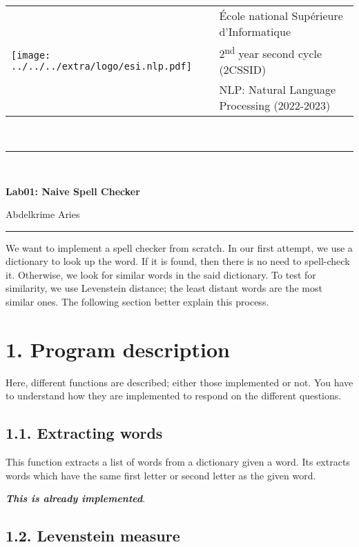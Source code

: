 \documentclass[11pt, a4paper]{article}
\begin{document}

\noindent
\begin{tabular}{ll}
\multirow{3}{*}{\texttt{[image: ../../../extra/logo/esi.nlp.pdf]}} & 
\'Ecole national Supérieure d'Informatique\\
& 2\textsuperscript{nd} year second cycle (2CSSID)\\
& NLP: Natural Language Processing (2022-2023)
\end{tabular}\\[.25cm]
\noindent\rule{\textwidth}{2pt}\\[-0.5cm]
\begin{center}
{\LARGE \textbf{Lab01: Naive Spell Checker}}
\begin{flushright}
	Abdelkrime Aries
\end{flushright}
\end{center}\vspace{-0.5cm}
\noindent\rule{\textwidth}{2pt}

We want to implement a spell checker from scratch. 
In our first attempt, we use a dictionary to look up the word.
If it is found, then there is no need to spell-check it.
Otherwise, we look for similar words in the said dictionary.
To test for similarity, we use Levenstein distance; the least distant words are the most similar ones.
The following section better explain this process.


\section*{1. Program description}

Here, different functions are described; either those implemented or not. 
You have to understand how they are implemented to respond on the different questions.

\subsection*{1.1. Extracting words}

This function extracts a list of words from a dictionary given a word.
Its extracts words which have the same first letter or second letter as the given word.

\textbf{\slshape This is already implemented}.

\subsection*{1.2. Levenstein measure}
\end{document}
